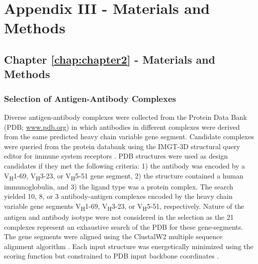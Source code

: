 \section{Appendix III - Materials and Methods}
\label{sec:appendixIII}
\par\vspace{10pt}
\subsection{Chapter \ref{chap:chapter2} - Materials and Methods}
\par\vspace{10pt}
\subsubsection{Selection of Antigen-Antibody Complexes}
Diverse antigen-antibody complexes were collected from the Protein Data Bank (PDB; \url{www.pdb.org}) in which antibodies in different complexes were derived from the same predicted heavy chain variable gene segment. Candidate complexes were queried from the protein databank using the IMGT-3D structural query editor for immune system receptors \citep{Kaas:2004kv}. PDB structures were used as design candidates if they met the following criteria: 1) the antibody was encoded by a V\textsubscript{H}1-69, V\textsubscript{H}3-23, or V\textsubscript{H}5-51 gene segment, 2) the structure contained a human immunoglobulin, and 3) the ligand type was a protein complex. The search yielded 10, 8, or 3 antibody-antigen complexes encoded by the heavy chain variable gene segments V\textsubscript{H}1-69, V\textsubscript{H}3-23, or V\textsubscript{H}5-51, respectively. Nature of the antigen and antibody isotype were not considered in the selection as the 21 complexes represent an exhaustive search of the PDB for these gene-segments. The gene segments were aligned using the ClustalW2 multiple sequence alignment algorithm \citep{Larkin:2007hz}. Each input structure was energetically minimized using the \rosetta scoring function but constrained to PDB input backbone coordinates \citep{Das:2007em}.


